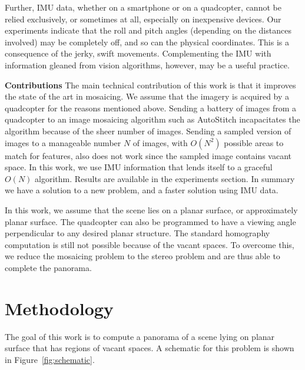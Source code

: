 Further, IMU data, whether on a smartphone or on a quadcopter, cannot
be relied exclusively, or sometimes at all, especially on inexpensive
devices. Our experiments indicate that the roll and pitch angles
(depending on the distances involved) may be completely off, and so
can the physical coordinates.  This is a consequence of the jerky,
swift movements.  Complementing the IMU with information gleaned from
vision algorithms, however, may be a useful practice.

{\bf Contributions} The main technical contribution of this work is
that it improves the state of the art in mosaicing.  We assume that
the imagery is acquired by a quadcopter for the reasons mentioned
above. Sending a battery of images from a quadcopter to an image
mosaicing algorithm such as AutoStitch incapacitates the algorithm
because of the sheer number of images. Sending a sampled version of
images to a manageable number $N$ of images, with $O(N^2)$ possible
areas to match for features, also does not work since the sampled
image contains vacant space.  In this work, we use IMU information
that lends itself to a graceful $O(N)$ algorithm.  Results are
available in the experiments section. In summary we have a solution to a new problem, and a
faster solution using IMU data.

In this work, we assume that the scene lies on a planar surface, or
approximately planar surface. The quadcopter can also be programmed to
have a viewing angle perpendicular to any desired planar structure.
The standard homography computation is still not possible because of
the vacant spaces. To overcome this, we reduce the mosaicing problem
to the stereo problem and are thus able to complete the panorama.


\section{Methodology}

The goal of this work is to compute a panorama of a scene lying on
planar surface that has regions of vacant spaces.  A schematic for
this problem is shown in Figure~\ref{fig:schematic}. 

